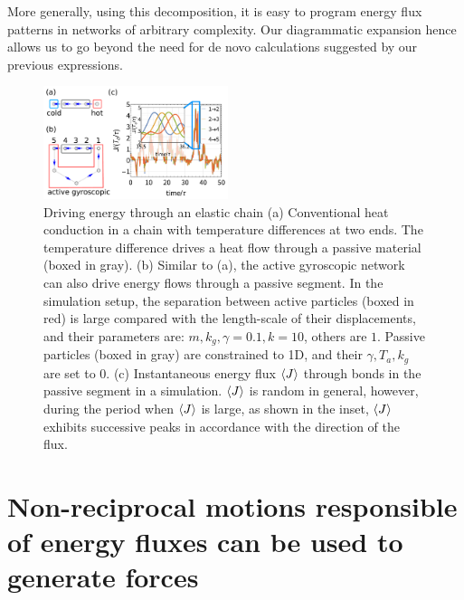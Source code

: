 \documentclass[
 preprint,
 preprintnumbers,
 amsmath,amssymb,
 aps,
 pre,
 longbibliography,
 superscriptaddress,
 10pt, twocolumn
]{revtex4-1}
\begin{document}
More generally, using this decomposition, it is easy to program energy flux patterns in networks of arbitrary complexity. Our diagrammatic expansion hence allows us to go beyond the need for de novo calculations suggested by our previous expressions.

\begin{figure}[tbp]
	\centering
	\includegraphics[width=0.48\textwidth]{simulation_j.pdf}
    \caption{
    Driving energy through an elastic chain
    (a) Conventional heat conduction in a chain with temperature differences at two ends. The temperature difference drives a heat flow through a passive material (boxed in gray).
    (b) Similar to (a), the active gyroscopic network can also drive energy flows through a passive segment. In the simulation setup, the separation between active particles (boxed in red) is large compared with the length-scale of their displacements, and their parameters are: $m,k_g,\gamma=0.1, k=10$, others are $1$. Passive particles (boxed in gray) are constrained to 1D, and their $\gamma,T_a,k_g$ are set to $0$.
    (c) Instantaneous energy flux $\expval{J}$ through bonds in the passive segment in a simulation. $\expval{J}$ is random in general, however, during the period when $\expval{J}$ is large, as shown in the inset, $\expval{J}$ exhibits successive peaks in accordance with the direction of the flux.
    }
    \label{fig:simulation}
\end{figure}
\section{Non-reciprocal motions responsible of energy fluxes can be used to generate forces} \label{sec:swimmer}
\end{document}
